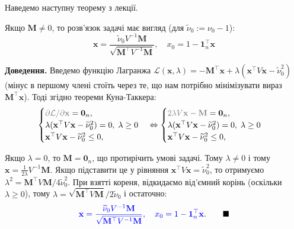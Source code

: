 \documentclass{test_template}
\begin{document}
Наведемо наступну теорему з лекції.
\begin{theorem}
    Якщо $\mathbf{M} \neq 0$, то розв'язок задачі має вигляд (для $\widetilde{\nu}_0:=\nu_0-1$):
    \begin{equation*}
        \mathbf{x} = \frac{\widetilde{\nu}_0V^{-1}\mathbf{M}}{\sqrt{\mathbf{M}^{\top}V^{-1}\mathbf{M}}}, \quad x_0 = 1 - \mathbf{1}_n^{\top}\mathbf{x}
    \end{equation*}
\end{theorem}

\textbf{Доведення.} Введемо функцію Лагранжа $\mathcal{L}(\mathbf{x},\lambda) =
-\mathbf{M}^{\top}\mathbf{x} +
\lambda(\mathbf{x}^{\top}V\mathbf{x}-\widetilde{\nu}_0^2)$ (мінус в першому
члені стоїть через те, що нам потрібно мінімізувати вираз
$\mathbf{M}^{\top}\mathbf{x}$). Тоді згідно теореми Куна-Таккера:
\begin{equation*}
    \begin{cases}
        \textcolor{gray}{\partial \mathcal{L}/\partial \mathbf{x}} = \mathbf{0}_n, \\
        \lambda(\mathbf{x}^{\top}V\mathbf{x}-\widetilde{\nu}_0^2) = 0, \; \lambda \geq 0 \\
        \mathbf{x}^{\top}V\mathbf{x} - \widetilde{\nu}_0^2 \leq 0, 
    \end{cases} \iff \begin{cases}
        \textcolor{gray}{2\lambda V\mathbf{x} - \mathbf{M}} = \mathbf{0}_n, \\
        \lambda(\mathbf{x}^{\top}V\mathbf{x}-\widetilde{\nu}_0^2) = 0, \; \lambda \geq 0 \\
        \mathbf{x}^{\top}V\mathbf{x} - \widetilde{\nu}_0^2 \leq 0, 
    \end{cases}
\end{equation*}

Якщо $\lambda=0$, то $\mathbf{M}=\mathbf{0}_n$, що протирічить умові задачі.
Тому $\lambda \neq 0$ і тому $\mathbf{x} = \frac{1}{2\lambda}V^{-1}\mathbf{M}$.
Якщо підставити це у рівняння
$\mathbf{x}^{\top}V\mathbf{x}=\widetilde{\nu}_0^2$, то отримуємо
$\lambda^2=\mathbf{M}^{\top}V\mathbf{M}/4\widetilde{\nu}_0^2$. При взятті
кореня, відкидаємо від'ємний корінь (оскільки $\lambda \geq 0$), тому
$\lambda=\sqrt{\mathbf{M}^{\top}V\mathbf{M}}/2\widetilde{\nu}_0$ і остаточно:
\begin{equation*}
    \textcolor{blue}{\mathbf{x} = \frac{\widetilde{\nu}_0V^{-1}\mathbf{M}}{\sqrt{\mathbf{M}^{\top}V^{-1}\mathbf{M}}}, \quad x_0 = 1 - \mathbf{1}_n^{\top}\mathbf{x}}. \quad \quad \blacksquare
\end{equation*}
\end{document}
